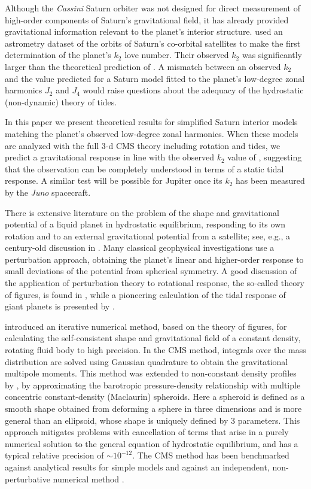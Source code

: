 Although the \textit{Cassini} Saturn orbiter was not designed for direct measurement
of high-order components of Saturn's gravitational field, it has already provided
gravitational information relevant to the planet's interior structure.
\citet{lainey2016} used an astrometry dataset of the orbits of Saturn's co-orbital
satellites to make the first determination of the planet's $k_2$ love number. Their
observed $k_2$ was significantly larger than the theoretical prediction of
\citet{gavrilov1977}. A mismatch between an observed $k_2$ and the value predicted
for a Saturn model fitted to the planet's low-degree zonal harmonics $J_2$ and $J_4$
would raise questions about the adequacy of the hydrostatic (non-dynamic) theory of
tides.  

In this paper we present theoretical results for simplified Saturn interior models
matching the planet's observed low-degree zonal harmonics.  When these models are
analyzed with the full 3-d CMS theory including rotation and tides, we predict a
gravitational response in line with the observed $k_2$ value of \citet{lainey2016},
suggesting that the observation can be completely understood in terms of a static
tidal response.  A similar test will be possible for Jupiter once its $k_2$ has been
measured by the \textit{Juno} spacecraft.

There is extensive literature on the problem of the shape and gravitational potential
of a liquid planet in hydrostatic equilibrium, responding to its own rotation and to
an external gravitational potential from a satellite; see, e.g., a century-old
discussion in \citet{jeans1919}.  Many classical geophysical investigations use a
perturbation approach, obtaining the planet's linear and higher-order response to
small deviations of the potential from spherical symmetry. A good discussion of the
application of perturbation theory to rotational response, the so-called theory of
figures, is found in \citet{zharkov1978}, while a pioneering calculation of the tidal
response of giant planets is presented by \citet{gavrilov1977}.

\citet{hubbard2012} introduced an iterative numerical method, based on the theory of
figures, for calculating the self-consistent shape and gravitational field of a
constant density, rotating fluid body to high precision. In the CMS method, integrals
over the mass distribution are solved using Gaussian quadrature to obtain the
gravitational multipole moments. This method was extended to non-constant density
profiles by \citet{hubbard2013}, by approximating the barotropic pressure-density
relationship with multiple concentric constant-density (Maclaurin) spheroids.  Here a
spheroid is defined as a smooth shape obtained from deforming a sphere in three
dimensions and is more general than an ellipsoid, whose shape is uniquely defined
by 3 parameters.  This approach mitigates problems with cancellation of
terms that arise in a purely numerical solution to the general equation of
hydrostatic equilibrium, and has a typical relative precision of $\sim 10^{-12}$. The
CMS method has been benchmarked against analytical results for simple models
\citep{Hubbard2014} and against an independent, non-perturbative numerical method
\citep{wisdom1996,wisdom2016}. 

